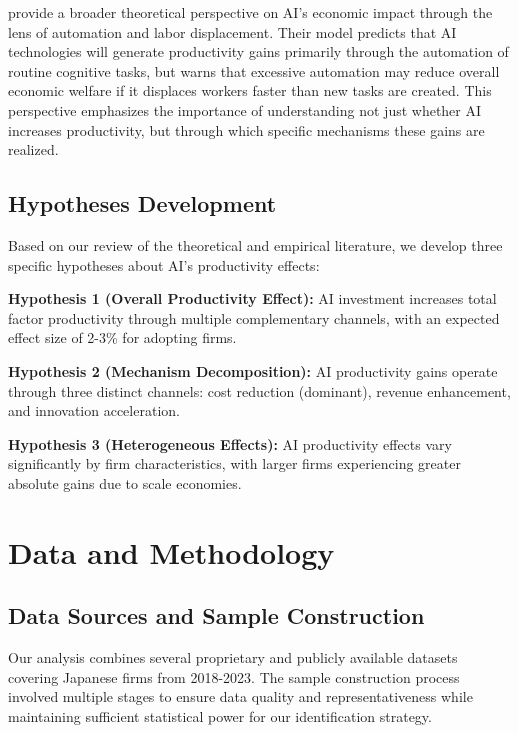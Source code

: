 \documentclass[12pt]{article}
\begin{document}
\citet{acemoglu2018race} provide a broader theoretical perspective on AI's economic impact through the lens of automation and labor displacement. Their model predicts that AI technologies will generate productivity gains primarily through the automation of routine cognitive tasks, but warns that excessive automation may reduce overall economic welfare if it displaces workers faster than new tasks are created. This perspective emphasizes the importance of understanding not just whether AI increases productivity, but through which specific mechanisms these gains are realized.

\subsection{Hypotheses Development}

Based on our review of the theoretical and empirical literature, we develop three specific hypotheses about AI's productivity effects:

\textbf{Hypothesis 1 (Overall Productivity Effect):} AI investment increases total factor productivity through multiple complementary channels, with an expected effect size of 2-3\% for adopting firms.

\textbf{Hypothesis 2 (Mechanism Decomposition):} AI productivity gains operate through three distinct channels: cost reduction (dominant), revenue enhancement, and innovation acceleration.

\textbf{Hypothesis 3 (Heterogeneous Effects):} AI productivity effects vary significantly by firm characteristics, with larger firms experiencing greater absolute gains due to scale economies.

\section{Data and Methodology}

\subsection{Data Sources and Sample Construction}

Our analysis combines several proprietary and publicly available datasets covering Japanese firms from 2018-2023. The sample construction process involved multiple stages to ensure data quality and representativeness while maintaining sufficient statistical power for our identification strategy.
\end{document}
